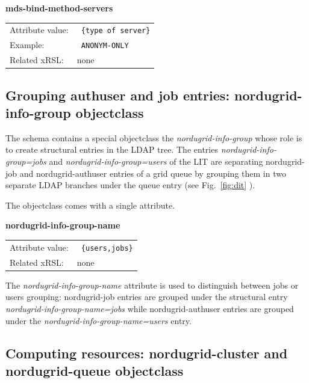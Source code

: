 \documentclass{article}
\begin{document}
  \hspace*{0.5cm}
  \begin{shaded}
    \textbf{mds-bind-method-servers}
  \end{shaded}
  \begin{tabular}{lp{10cm}}  
    Attribute value:&\verb# {type of server}#\\
    Example: &\verb# ANONYM-ONLY #\\
    Related xRSL:&none \\
  \end{tabular}

\subsection{Grouping authuser and job entries: nordugrid-info-group objectclass}

The schema contains a special objectclass the {\it nordugrid-info-group}
whose role is to create structural entries in the LDAP tree.
The entries {\it nordugrid-info-group=jobs} and {\it nordugrid-info-group=users}
of the LIT are separating nordugrid-job and nordugrid-authuser entries of a 
grid queue by grouping them in two
separate LDAP branches under the queue entry (see Fig.~\ref{fig:dit} ).  

The objectclass comes with a single attribute.

  \hspace*{0.5cm}
  \begin{shaded}
    \textbf{nordugrid-info-group-name}
  \end{shaded}
  \begin{tabular}{lp{10cm}}  
    Attribute value:&\verb# {users,jobs}#\\
    Related xRSL:&none \\
  \end{tabular}

The {\it nordugrid-info-group-name} attribute
is used to distinguish between jobs or users grouping:
nordugrid-job entries are grouped under the structural entry 
{\it nordugrid-info-group-name=jobs} while nordugrid-authuser entries are
grouped under the {\it nordugrid-info-group-name=users} entry.


\subsection{Computing resources: nordugrid-cluster and nordugrid-queue objectclass}
\label{section:cluster-queue}
\end{document}
